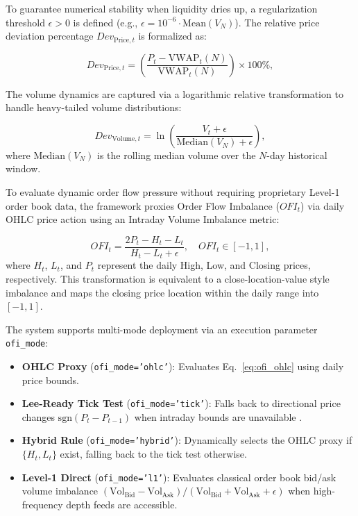 \documentclass[pdflatex,sn-mathphys-num]{sn-jnl}
\theoremstyle{thmstyleone}
\theoremstyle{thmstyletwo}
\theoremstyle{thmstylethree}
\begin{document}
To guarantee numerical stability when liquidity dries up, a regularization threshold $\epsilon > 0$ is defined (e.g., $\epsilon = 10^{-6} \cdot \mathrm{Mean}(V_N)$). The relative price deviation percentage $Dev_{\mathrm{Price},t}$ is formalized as:

\begin{equation}
    Dev_{\mathrm{Price},t} = \left( \frac{P_t - \mathrm{VWAP}_t(N)}{\mathrm{VWAP}_t(N)} \right) \times 100\%,
    \label{eq:devprice}
\end{equation}

The volume dynamics are captured via a logarithmic relative transformation to handle heavy-tailed volume distributions:

\begin{equation}
    Dev_{\mathrm{Volume},t} = \ln \left( \frac{V_t + \epsilon}{\mathrm{Median}(V_N) + \epsilon} \right),
    \label{eq:devvol}
\end{equation}
where $\mathrm{Median}(V_N)$ is the rolling median volume over the $N$-day historical window.

To evaluate dynamic order flow pressure without requiring proprietary Level-1 order book data, the framework proxies Order Flow Imbalance ($OFI_t$) via daily OHLC price action using an Intraday Volume Imbalance metric:

\begin{equation}
    OFI_t = \frac{2 P_{t} - H_t - L_t}{H_t - L_t + \epsilon}, \quad OFI_t \in [-1, 1],
    \label{eq:ofi_ohlc}
\end{equation}
where $H_t$, $L_t$, and $P_t$ represent the daily High, Low, and Closing prices, respectively. This transformation is equivalent to a close-location-value style imbalance and maps the closing price location within the daily range into $[-1,1]$.

The system supports multi-mode deployment via an execution parameter \texttt{ofi\_mode}:
\begin{itemize}
    \item \textbf{OHLC Proxy} (\texttt{ofi\_mode='ohlc'}): Evaluates Eq.~\eqref{eq:ofi_ohlc} using daily price bounds.
    \item \textbf{Lee-Ready Tick Test} (\texttt{ofi\_mode='tick'}): Falls back to directional price changes $\mathrm{sgn}(P_t - P_{t-1})$ when intraday bounds are unavailable \cite{leeready1991}.
    \item \textbf{Hybrid Rule} (\texttt{ofi\_mode='hybrid'}): Dynamically selects the OHLC proxy if $\{H_t, L_t\}$ exist, falling back to the tick test otherwise.
    \item \textbf{Level-1 Direct} (\texttt{ofi\_mode='l1'}): Evaluates classical order book bid/ask volume imbalance $(\mathrm{Vol}_{\mathrm{Bid}} - \mathrm{Vol}_{\mathrm{Ask}})/(\mathrm{Vol}_{\mathrm{Bid}} + \mathrm{Vol}_{\mathrm{Ask}} + \epsilon)$ when high-frequency depth feeds are accessible.
\end{itemize}
\end{document}
